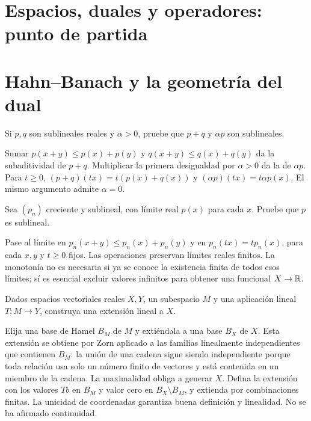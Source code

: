 
\chapter{Espacios, duales y operadores: punto de partida}

\chapter{Hahn--Banach y la geometría del dual}

\begin{ejercicio}\label{ej:v3-l01-1}
Si $p,q$ son sublineales reales y $\alpha>0$, pruebe que $p+q$ y $\alpha p$ son sublineales.
\end{ejercicio}
\begin{solucion}
Sumar $p(x+y)\leq p(x)+p(y)$ y $q(x+y)\leq q(x)+q(y)$ da la subaditividad de $p+q$. Multiplicar la primera desigualdad por $\alpha>0$ da la de $\alpha p$. Para $t\geq0$, $(p+q)(tx)=t(p(x)+q(x))$ y $(\alpha p)(tx)=t\alpha p(x)$. El mismo argumento admite $\alpha=0$.
\end{solucion}

\begin{ejercicio}\label{ej:v3-l01-2}
Sea $(p_n)$ creciente y sublineal, con límite real $p(x)$ para cada $x$. Pruebe que $p$ es sublineal.
\end{ejercicio}
\begin{solucion}
Pase al límite en $p_n(x+y)\leq p_n(x)+p_n(y)$ y en $p_n(tx)=tp_n(x)$, para cada $x,y$ y $t\geq0$ fijos. Las operaciones preservan límites reales finitos. La monotonía no es necesaria si ya se conoce la existencia finita de todos esos límites; sí es esencial excluir valores infinitos para obtener una funcional $X\to\mathbb R$.
\end{solucion}

\begin{ejercicio}\label{ej:v3-l01-3}
Dados espacios vectoriales reales $X,Y$, un subespacio $M$ y una aplicación lineal $T:M\to Y$, construya una extensión lineal a $X$.
\end{ejercicio}
\begin{solucion}
Elija una base de Hamel $B_M$ de $M$ y extiéndala a una base $B_X$ de $X$. Esta extensión se obtiene por Zorn aplicado a las familias linealmente independientes que contienen $B_M$: la unión de una cadena sigue siendo independiente porque toda relación usa solo un número finito de vectores y está contenida en un miembro de la cadena. La maximalidad obliga a generar $X$. Defina la extensión con los valores $Tb$ en $B_M$ y valor cero en $B_X\setminus B_M$, y extienda por combinaciones finitas. La unicidad de coordenadas garantiza buena definición y linealidad. No se ha afirmado continuidad.
\end{solucion}

